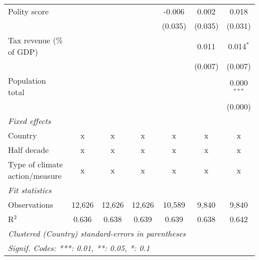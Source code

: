 \begin{tabular}{lcccccc}
   Polity score                                                             &         &               &               & -0.006        & 0.002         & 0.018\\   
                                                                            &         &               &               & (0.035)       & (0.035)       & (0.031)\\   
   Tax revenue (\% of GDP)                                                  &         &               &               &               & 0.011         & 0.014$^{*}$\\   
                                                                            &         &               &               &               & (0.007)       & (0.007)\\   
   Population total                                                         &         &               &               &               &               & 0.000$^{***}$\\   
                                                                            &         &               &               &               &               & (0.000)\\   
   \emph{Fixed effects}\\
   Country                                                                  & x       & x             & x             & x             & x             & x\\  
   Half decade                                                              & x       & x             & x             & x             & x             & x\\  
   Type of climate action/measure                                           & x       & x             & x             & x             & x             & x\\  
   \midrule \emph{Fit statistics}\\
   Observations                                                             & 12,626  & 12,626        & 12,626        & 10,589        & 9,840         & 9,840\\  
   R$^2$                                                                    & 0.636   & 0.638         & 0.639         & 0.639         & 0.638         & 0.642\\  
   \midrule
   \multicolumn{7}{l}{\emph{Clustered (Country) standard-errors in parentheses}}\\
   \multicolumn{7}{l}{\emph{Signif. Codes: ***: 0.01, **: 0.05, *: 0.1}}\\
\end{tabular}
\par\endgroup


